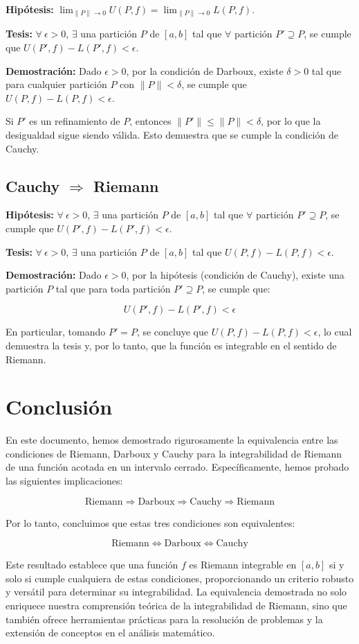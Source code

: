 \documentclass{article}
\begin{document}
	\textbf{Hipótesis:} $\lim_{\|P\| \to 0} U(P, f) = \lim_{\|P\| \to 0} L(P, f)$.
	
	\textbf{Tesis:} $\forall\ \epsilon > 0$, $\exists$ una partición $P$ de $[a, b]$ tal que $\forall$ partición $P' \supseteq P$, se cumple que $U(P', f) - L(P', f) < \epsilon$.
	
	\textbf{Demostración:} Dado $\epsilon > 0$, por la condición de Darboux, existe $\delta > 0$ tal que para cualquier partición $P$ con $\|P\| < \delta$, se cumple que $U(P, f) - L(P, f) < \epsilon$.
	
	Si $P'$ es un refinamiento de $P$, entonces $\|P'\| \leq \|P\| < \delta$, por lo que la desigualdad sigue siendo válida. Esto demuestra que se cumple la condición de Cauchy.
	
	\subsection{Cauchy $\Rightarrow$ Riemann}

	\textbf{Hipótesis:} $\forall\ \epsilon > 0$, $\exists$ una partición $P$ de $[a, b]$ tal que $\forall$ partición $P' \supseteq P$, se cumple que $U(P', f) - L(P', f) < \epsilon$.
	
	\textbf{Tesis:} $\forall\ \epsilon > 0$, $\exists$ una partición $P$ de $[a, b]$ tal que $U(P, f) - L(P, f) < \epsilon$.
	
	\textbf{Demostración:} Dado $\epsilon > 0$, por la hipótesis (condición de Cauchy), existe una partición $P$ tal que para toda partición $P' \supseteq P$, se cumple que:
	
	$$ U(P', f) - L(P', f) < \epsilon $$
	
	En particular, tomando $P' = P$, se concluye que $U(P, f) - L(P, f) < \epsilon$, lo cual demuestra la tesis y, por lo tanto, que la función es integrable en el sentido de Riemann.
	
	\section{Conclusión}
	En este documento, hemos demostrado rigurosamente la equivalencia entre las condiciones de Riemann, Darboux y Cauchy para la integrabilidad de Riemann de una función acotada en un intervalo cerrado. Específicamente, hemos probado las siguientes implicaciones:
	
	$$ \text{Riemann} \Rightarrow \text{Darboux} \Rightarrow \text{Cauchy} \Rightarrow \text{Riemann} $$
	
	Por lo tanto, concluimos que estas tres condiciones son equivalentes:
	
	$$ \text{Riemann} \Leftrightarrow \text{Darboux} \Leftrightarrow \text{Cauchy} $$
	
	Este resultado establece que una función $f$ es Riemann integrable en $[a, b]$ si y solo si cumple cualquiera de estas condiciones, proporcionando un criterio robusto y versátil para determinar su integrabilidad. La equivalencia demostrada no solo enriquece nuestra comprensión teórica de la integrabilidad de Riemann, sino que también ofrece herramientas prácticas para la resolución de problemas y la extensión de conceptos en el análisis matemático.
\end{document}
